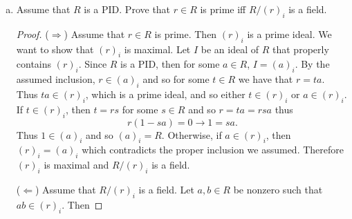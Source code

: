 \documentclass[12pt]{article}
\begin{document}
\begin{enumerate}
\begin{enumerate}[(a)]
\begin{proof}
                        Hence, for some $r\in r$ and $m\in M$ we have that
                        $1=ar+m$ which implies that $(a+M)(r+M)=1+M$. Since
                        $r\in R$ was arbirary, then every element of $R/M$ is
                        a unit and therefore $R/M$ is a field.\par\hfill
                        ($\Leftarrow$) Assume that $R/M$ is a field and that
                        $B$ is an ideal of $R$ properly containing $M$. Let
                        $b\in B-M$. Then $b+M$ is a nonzero element of $R/M$
                        and is therefore a unit. Then for some $c\in R$ we have
                        that $(b+M)(c+M)=bc+M=1+M$. This implies that $1-bc\in
                        M\subset B$. And since $b\in B$ and $c\in R$, then
                        $bc\in B$. Thus $(1-bc)+bc=1\in B$. Hence $B=R$.
                        Therefore $M$ is a maximal ideal. 
                    \end{proof}
                \item Assume that $R$ is a PID. Prove that $r\in R$ is prime
                    iff $R/(r)_i$ is a field. 
                    \begin{proof}
                        ($\Rightarrow$) Assume that $r\in R$ is prime. Then
                        $(r)_i$ is a prime ideal. We want to show that $(r)_i$
                        is maximal. Let $I$ be an ideal of $R$ that properly
                        contains $(r)_i$. Since $R$ is a PID, then for some
                        $a\in R$, $I=(a)_i$. By the assumed inclusion, $r\in
                        (a)_i$ and so for some $t\in R$ we have that $r=ta$.
                        Thus $ta\in(r)_i$, which is a prime ideal, and so
                        either $t\in(r)_i$ or $a\in(r)_i$. If $t\in(r)_i$, then
                        $t=rs$ for some $s\in R$ and so $r=ta=rsa$ thus 
                        \begin{equation*}
                            r(1-sa)=0\rightarrow 1=sa.
                        \end{equation*}
                        Thus $1\in (a)_i$ and so $(a)_i=R$. Otherwise, if
                        $a\in(r)_i$, then $(r)_i=(a)_i$ which contradicts the
                        proper inclusion we assumed. Therefore $(r)_i$ is
                        maximal and $R/(r)_i$ is a field.\hfill\par
                        ($\Leftarrow$) Assume that $R/(r)_i$ is a field. Let
                        $a, b\in R$ be nonzero such that $ab\in (r)_i$. Then

\end{proof}
\end{enumerate}
\end{enumerate}
\end{document}
